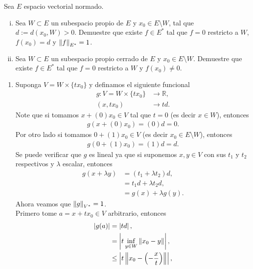 \begin{homeworkProblem}
  Sea $E$ espacio vectorial normado.
  \begin{enumerate}[(i)]
    \item Sea $W\subset E$ un subespacio propio de $E$ y $x_0\in E\setminus W$, tal que $d:=d(x_0,W)>0$. Demuestre que existe $f\in E^{*}$ tal que $f=0$ restricto a $W$, $f(x_0)=d$ y $\left\|f\right\|_{E^*}=1$.
    \item Sea $W\subset E$ un subespacio propio cerrado de $E$ y $x_0\in E\setminus W$. Demuestre que existe $f\in E^{*}$ tal que $f=0$ restricto a $W$ y $f(x_0)\neq 0$. 
  \end{enumerate}
  \begin{solution}
    \begin{enumerate}
      \item Suponga $V=W\times \{tx_0\}$ y definamos el siguiente funcional
        \begin{align*}
          g:V=W\times \{tx_0\}&\to \mathbb{R},\\
          (x,tx_0)&\to td.
        \end{align*}
        Note que si tomamos $x+(0)x_0\in V$ tal que $t=0$ (es decir $x\in W$), entonces
        \begin{align*}
          g(x+(0)x_0)=(0)d=0.
        \end{align*}
        Por otro lado si tomamos $0+(1)x_0\in V$ (es decir $x_0\in E\setminus W$), entonces 
        \begin{align*}
          g(0+(1)x_0)=(1)d=d.
        \end{align*}
        Se puede verificar que $g$ es lineal ya que si suponemos $x,y\in V$ con sus $t_1$ y  $t_2$ respectivos y $\lambda$ escalar, entonces
        \begin{align*}
          g(x+\lambda y)&=(t_1+\lambda t_2)d,\\
          &=t_1d+\lambda t_2d,\\
          &=g(x)+\lambda g(y).
        \end{align*}
        Ahora veamos que $\left\|g\right\|_{V^{*}}=1$.\\
        Primero tome $a=x+tx_0\in V$ arbitrario, entonces
        \begin{align*}
          \left| g(a) \right|&=\left| td \right|,\\
          &=\left| t\inf_{y\in W}\norm{x_0-y} \right|,\\
          &\leq \left| t\norm{x_0-\left( -\frac{x}{t} \right)} \right|,\\

\end{align*}
\end{enumerate}
\end{solution}
\end{homeworkProblem}
